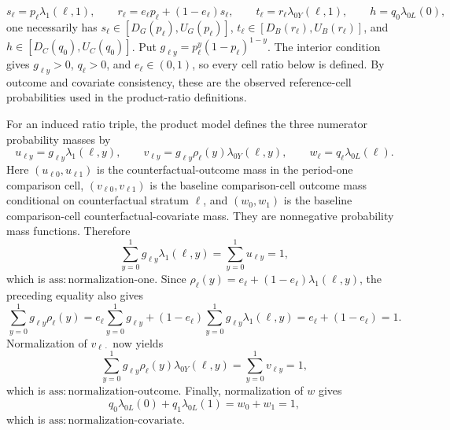 \[
s_\ell=p_\ell\lambda_1(\ell,1),\qquad
r_\ell=e_\ell p_\ell+(1-e_\ell)s_\ell,\qquad
t_\ell=r_\ell\lambda_{0Y}(\ell,1),\qquad
h=q_0\lambda_{0L}(0),
\]
one necessarily has \(s_\ell\in[D_G(p_\ell),U_G(p_\ell)]\), \(t_\ell\in[D_B(r_\ell),U_B(r_\ell)]\), and \(h\in[D_C(q_0),U_C(q_0)]\).
Put \(g_{\ell y}=p_\ell^y(1-p_\ell)^{1-y}\). The interior condition gives \(g_{\ell y}>0\), \(q_\ell>0\), and \(e_\ell\in(0,1)\), so every cell ratio below is defined. By outcome and covariate consistency, these are the observed reference-cell probabilities used in the product-ratio definitions.

For an induced ratio triple, the product model defines the three numerator probability masses by
\[
u_{\ell y}=g_{\ell y}\lambda_1(\ell,y),\qquad
v_{\ell y}=g_{\ell y}\rho_\ell(y)\lambda_{0Y}(\ell,y),\qquad
w_\ell=q_\ell\lambda_{0L}(\ell).
\]
Here \((u_{\ell0},u_{\ell1})\) is the counterfactual-outcome mass in the period-one comparison cell, \((v_{\ell0},v_{\ell1})\) is the baseline comparison-cell outcome mass conditional on counterfactual stratum \(\ell\), and \((w_0,w_1)\) is the baseline comparison-cell counterfactual-covariate mass. They are nonnegative probability mass functions. Therefore
\[
\sum_{y=0}^1g_{\ell y}\lambda_1(\ell,y)
=\sum_{y=0}^1u_{\ell y}=1,
\]
which is \(\mathrm{ass{:}normalization\text{-}one}\). Since \(\rho_\ell(y)=e_\ell+(1-e_\ell)\lambda_1(\ell,y)\), the preceding equality also gives
\[
\sum_{y=0}^1g_{\ell y}\rho_\ell(y)
=e_\ell\sum_{y=0}^1g_{\ell y}
 +(1-e_\ell)\sum_{y=0}^1g_{\ell y}\lambda_1(\ell,y)
=e_\ell+(1-e_\ell)=1.
\]
Normalization of \(v_{\ell\cdot}\) now yields
\[
\sum_{y=0}^1g_{\ell y}\rho_\ell(y)\lambda_{0Y}(\ell,y)
=\sum_{y=0}^1v_{\ell y}=1,
\]
which is \(\mathrm{ass{:}normalization\text{-}outcome}\). Finally, normalization of \(w\) gives
\[
q_0\lambda_{0L}(0)+q_1\lambda_{0L}(1)=w_0+w_1=1,
\]
which is \(\mathrm{ass{:}normalization\text{-}covariate}\).

